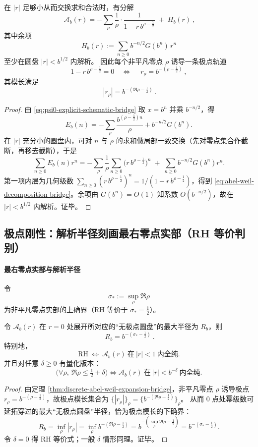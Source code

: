 \begin{theorem}\label{thm:discrete-abel-weil-expansion-bridge}
在 $|r|$ 足够小从而交换求和合法时，有分解
\begin{equation}\label{eq:abel-weil-decomposition-bridge}
\boxed{\ \mathcal A_b(r)
=-\sum_{\rho}\frac{1}{\rho}\cdot\frac{1}{1-r\,b^{\rho-\frac12}}
\;+\;H_b(r)\ },
\end{equation}
其中余项
$$
H_b(r):=\sum_{n\ge 0}b^{-n/2}G(b^n)\,r^n
$$
至少在圆盘 $|r|<b^{1/2}$ 内解析。
因此每个非平凡零点 $\rho$ 诱导一条极点轨道
$$
1-r\,b^{\rho-\frac12}=0
\quad\Longleftrightarrow\quad
\boxed{\ r_\rho=b^{-(\rho-\frac12)}\ },
$$
其模长满足
$$
\boxed{\ |r_\rho|=b^{-(\Re\rho-\frac12)}\ }.
$$
\end{theorem}
\begin{proof}
由 \eqref{eq:psi0-explicit-schematic-bridge} 取 $x=b^n$ 并乘 $b^{-n/2}$，得
$$
E_b(n)=-\sum_\rho \frac{b^{(\rho-\frac12)n}}{\rho}+b^{-n/2}G(b^n).
$$
在 $|r|$ 充分小的圆盘内，可对 $n$ 与 $\rho$ 的求和做局部一致交换（先对零点集合作截断，再移去截断），于是
$$
\sum_{n\ge 0}E_b(n)r^n
=-\sum_\rho \frac{1}{\rho}\sum_{n\ge 0}\bigl(r\,b^{\rho-\frac12}\bigr)^n
\;+\;\sum_{n\ge 0}b^{-n/2}G(b^n)r^n.
$$
第一项内层为几何级数 $\sum_{n\ge 0}(r\,b^{\rho-\frac12})^n=1/(1-r\,b^{\rho-\frac12})$，得到 \eqref{eq:abel-weil-decomposition-bridge}。余项由 $G(b^n)=O(1)$ 知系数 $O(b^{-n/2})$，故在 $|r|<b^{1/2}$ 内解析。证毕。
\end{proof}

\subsection{极点刚性：解析半径刻画最右零点实部（RH 等价判别）}
\label{subsec:abel-weil-polar-rigidity}

\paragraph{最右零点实部与解析半径}
令
$$
\sigma_*:=\sup_{\rho}\Re\rho
$$
为非平凡零点实部的上确界（RH 等价于 $\sigma_*=\tfrac12$）。

\begin{theorem}[解析半径刻画最右零点实部]\label{thm:radius-captures-sigma-star-bridge}
令 $\mathcal A_b(r)$ 在 $r=0$ 处展开所对应的“无极点圆盘”的最大半径为 $R_b$，则
$$
\boxed{\ R_b=b^{-(\sigma_*-\frac12)}\ }.
$$
特别地，
$$
\boxed{\ \mathrm{RH}\ \Longleftrightarrow\ \mathcal A_b(r)\ \text{在}\ |r|<1\ \text{内全纯}.\ }
$$
并且对任意 $\delta\ge 0$ 有量化版本：
$$
\boxed{\ \bigl(\forall\rho,\ \Re\rho\le\tfrac12+\delta\bigr)
\Longleftrightarrow
\mathcal A_b(r)\ \text{在}\ |r|<b^{-\delta}\ \text{内全纯}.\ }
$$
\end{theorem}
\begin{proof}
由定理 \ref{thm:discrete-abel-weil-expansion-bridge}，非平凡零点 $\rho$ 诱导极点 $r_\rho=b^{-(\rho-\frac12)}$，故极点模长集合为
$
\{|r_\rho|\}_\rho=\{b^{-(\Re\rho-\frac12)}\}_\rho
$。
从而 $0$ 点处幂级数可延拓穿过的最大“无极点圆盘”半径，恰为极点模长的下确界：
$$
R_b=\inf_\rho |r_\rho|
=\inf_\rho b^{-(\Re\rho-\frac12)}
=b^{-(\sup_\rho \Re\rho-\frac12)}
=b^{-(\sigma_*-\frac12)}.
$$
令 $\delta=0$ 得 RH 等价式；一般 $\delta$ 情形同理。证毕。
\end{proof}

